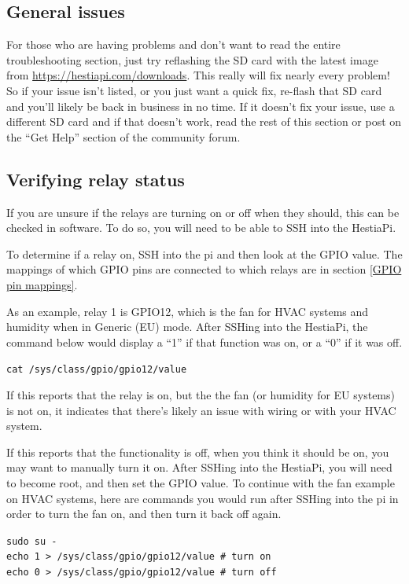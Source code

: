 \subsection{General issues}
For those who are having problems and don't want to read the entire
troubleshooting section, just try reflashing the SD card with the latest image
from \url{https://hestiapi.com/downloads}. This really will fix nearly every
problem! So if your issue isn't listed, or you just want a quick fix, re-flash
that SD card and you'll likely be back in business in no time. If it doesn't
fix your issue, use a different SD card and if that doesn't work, read the rest
of this section or post on the ``Get Help'' section of the community forum.

\subsection{Verifying relay status} \label{Verifying relay status}
If you are unsure if the relays are turning on or off when they should, this
can be checked in software. To do so, you will need to be able to SSH into the
HestiaPi.

To determine if a relay on, SSH into the pi and then look at the GPIO value.
The mappings of which GPIO pins are connected to which relays are in section
\ref{GPIO pin mappings}.

As an example, relay 1 is GPIO12, which is the fan for HVAC systems and
humidity when in Generic (EU) mode. After SSHing into the HestiaPi, the command
below would display a ``1'' if that function was on, or a ``0'' if it was off.

\texttt{cat /sys/class/gpio/gpio12/value}

If this reports that the relay is on, but the the fan (or humidity for EU
systems) is not on, it indicates that there's likely an issue with wiring or
with your HVAC system.

If this reports that the functionality is off, when you think it should be on,
you may want to manually turn it on. After SSHing into the HestiaPi, you will
need to become root, and then set the GPIO value. To continue with the fan
example on HVAC systems, here are commands you would run after SSHing into the
pi in order to turn the fan on, and then turn it back off again.

\texttt{sudo su -\\
echo 1 > /sys/class/gpio/gpio12/value \# turn on\\
echo 0 > /sys/class/gpio/gpio12/value \# turn off\\
}

